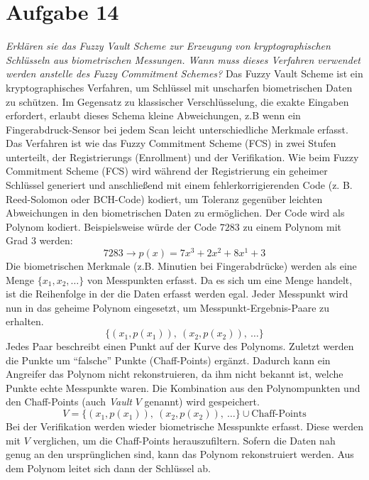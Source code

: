 \section{Aufgabe 14}
\textit{Erklären sie das Fuzzy Vault Scheme zur Erzeugung von kryptographischen Schlüsseln
aus biometrischen Messungen. Wann muss dieses Verfahren verwendet werden anstelle
des Fuzzy Commitment Schemes?}\vspace*{1em}\newline
Das Fuzzy Vault Scheme ist ein kryptographisches Verfahren, um Schlüssel mit unscharfen biometrischen Daten 
zu schützen. Im Gegensatz zu klassischer Verschlüsselung, die exakte Eingaben erfordert, 
erlaubt dieses Schema kleine Abweichungen, z.B wenn ein Fingerabdruck-Sensor bei jedem Scan leicht 
unterschiedliche Merkmale erfasst. Das Verfahren ist wie das Fuzzy Commitment Scheme (FCS) in zwei Stufen unterteilt,
der Registrierungs (Enrollment) und der Verifikation. Wie beim Fuzzy Commitment Scheme (FCS) wird während der Registrierung 
ein geheimer Schlüssel generiert und anschließend mit einem fehlerkorrigierenden Code (z. B. Reed-Solomon oder BCH-Code) 
kodiert, um Toleranz gegenüber leichten Abweichungen in den biometrischen Daten zu ermöglichen. Der Code wird als
Polynom kodiert. Beispielsweise würde der Code $7283$ zu einem Polynom mit Grad $3$ werden:
\[
    7283 \longrightarrow p(x)=7x^3 + 2x^2 + 8x^1 + 3
\]
Die biometrischen Merkmale (z.B. Minutien bei Fingerabdrücke) werden als eine Menge $\{x_1,x_2,\dots\}$ von Messpunkten erfasst. Da es
sich um eine Menge handelt, ist die Reihenfolge in der die Daten erfasst werden egal.
Jeder Messpunkt wird nun in das geheime Polynom eingesetzt, um Messpunkt-Ergebnis-Paare zu erhalten.
\[
    \{(x_1, p(x_1)),\ (x_2, p(x_2)),\ \dots\}
\]
Jedes Paar beschreibt einen Punkt auf der Kurve des Polynoms. Zuletzt werden die Punkte um "`falsche"' Punkte (Chaff-Points)
ergänzt. Dadurch kann ein Angreifer das Polynom nicht rekonstruieren, da ihm nicht bekannt ist, welche Punkte 
echte Messpunkte waren. Die Kombination aus den Polynompunkten und den Chaff-Points (auch \textit{Vault} $V$ genannt) wird
gespeichert.
\[
    V = \{(x_1, p(x_1)),\ (x_2, p(x_2)),\ \dots\}\cup \text{Chaff-Points}
\]
Bei der Verifikation werden wieder biometrische Messpunkte erfasst. Diese werden mit $V$ verglichen,
um die Chaff-Points herauszufiltern. Sofern die Daten nah genug an den ursprünglichen sind, kann 
das Polynom rekonstruiert werden. Aus dem Polynom leitet sich dann der Schlüssel ab.
